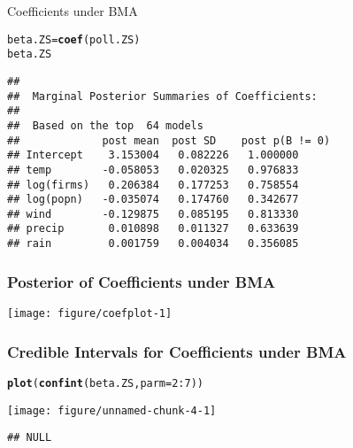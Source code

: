 \documentclass{beamer}\usepackage[]{graphicx}\usepackage[]{color}
\makeatletter
\def\maxwidth{ %
  \ifdim\Gin@nat@width>\linewidth
    \linewidth
  \else
    \Gin@nat@width
  \fi
}
\newcommand{\hlnum}[1]{\textcolor[rgb]{0.686,0.059,0.569}{#1}}%
\newcommand{\hlopt}[1]{\textcolor[rgb]{0,0,0}{#1}}%
\newcommand{\hlstd}[1]{\textcolor[rgb]{0.345,0.345,0.345}{#1}}%
\newcommand{\hlkwb}[1]{\textcolor[rgb]{0.69,0.353,0.396}{#1}}%
\newcommand{\hlkwc}[1]{\textcolor[rgb]{0.333,0.667,0.333}{#1}}%
\newcommand{\hlkwd}[1]{\textcolor[rgb]{0.737,0.353,0.396}{\textbf{#1}}}%
\newenvironment{kframe}{%
 \def\at@end@of@kframe{}%
 \ifinner\ifhmode%
  \def\at@end@of@kframe{\end{minipage}}%
  \begin{minipage}{\columnwidth}%
 \fi\fi%
 \def\FrameCommand##1{\hskip\@totalleftmargin \hskip-\fboxsep
 \colorbox{shadecolor}{##1}\hskip-\fboxsep
     \hskip-\linewidth \hskip-\@totalleftmargin \hskip\columnwidth}%
 \MakeFramed {\advance\hsize-\width
   \@totalleftmargin\z@ \linewidth\hsize
   \@setminipage}}%
 {\par\unskip\endMakeFramed%
 \at@end@of@kframe}
\newenvironment{knitrout}{}{} %
\makeatother
\begin{document}
\begin{frame}[fragile] {Coefficients under BMA}
\begin{knitrout}
\color{fgcolor}\begin{kframe}
\begin{alltt}
\hlstd{beta.ZS} \hlkwb{=} \hlkwd{coef}\hlstd{(poll.ZS)}
\hlstd{beta.ZS}
\end{alltt}
\begin{verbatim}
## 
##  Marginal Posterior Summaries of Coefficients: 
## 
##  Based on the top  64 models 
##             post mean  post SD    post p(B != 0)
## Intercept    3.153004   0.082226   1.000000     
## temp        -0.058053   0.020325   0.976833     
## log(firms)   0.206384   0.177253   0.758554     
## log(popn)   -0.035074   0.174760   0.342677     
## wind        -0.129875   0.085195   0.813330     
## precip       0.010898   0.011327   0.633639     
## rain         0.001759   0.004034   0.356085
\end{verbatim}
\end{kframe}
\end{knitrout}
\end{frame}

\begin{frame}[fragile] \frametitle{Posterior of Coefficients under BMA}
\begin{knitrout}
\color{fgcolor}

{\centering \texttt{[image: figure/coefplot-1]} 

}



\end{knitrout}
\end{frame}

\begin{frame}[fragile] \frametitle{Credible Intervals for Coefficients under BMA}
\begin{knitrout}
\color{fgcolor}\begin{kframe}
\begin{alltt}
\hlkwd{plot}\hlstd{(}\hlkwd{confint}\hlstd{(beta.ZS,} \hlkwc{parm}\hlstd{=}\hlnum{2}\hlopt{:}\hlnum{7}\hlstd{))}
\end{alltt}
\end{kframe}

{\centering \texttt{[image: figure/unnamed-chunk-4-1]} 

}


\begin{kframe}\begin{verbatim}
## NULL
\end{verbatim}
\end{kframe}
\end{knitrout}
\end{frame}
\end{document}
